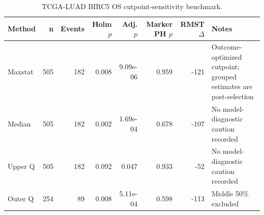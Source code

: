 \begin{table}[t]
\centering
\caption{TCGA-LUAD BIRC5 OS cutpoint-sensitivity benchmark.}
\label{tab:luad-birc5-os-cutpoints}
\begin{tabular}{lrrrrrrl}
\toprule
Method & n & Events & Holm $p$ & Adj. $p$ & Marker PH $p$ & RMST $\Delta$ & Notes \\
\midrule
Maxstat & 505 & 182 & 0.008 & 9.09e-06 & 0.959 & -121 & Outcome-optimized cutpoint; grouped estimates are post-selection \\
Median & 505 & 182 & 0.002 & 1.69e-04 & 0.678 & -107 & No model-diagnostic caution recorded \\
Upper Q & 505 & 182 & 0.092 & 0.047 & 0.933 & -52 & No model-diagnostic caution recorded \\
Outer Q & 254 & 89 & 0.008 & 5.11e-04 & 0.598 & -113 & Middle 50\% excluded \\
\bottomrule
\end{tabular}
\end{table}
